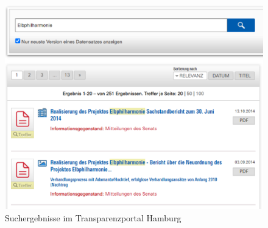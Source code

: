 \begin{figure}
	\includegraphics[width=\textwidth]{graphics/3-transparenzportal}
	\caption[Suchergebnisse im Transparenzportal Hamburg]{Suchergebnisse im Transparenzportal Hamburg}
	\label{fig:3_transparenzportal}
\end{figure}




